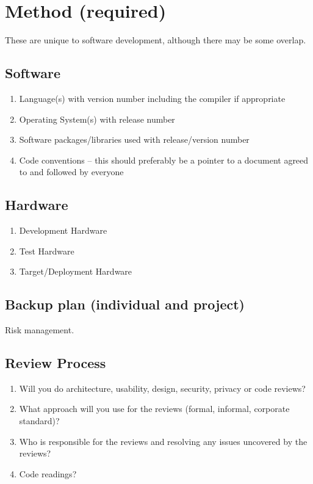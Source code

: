\section{Method (required)}
These are unique to software development, although there may be some overlap.

\subsection{Software}
\begin{enumerate}
\item Language(s) with version number including the compiler if appropriate 
\item Operating System(s) with release number 
\item Software packages/libraries used with release/version number 
\item Code conventions – this should preferably be a pointer to a document agreed to and followed by everyone 
\end{enumerate}

\subsection{Hardware}
\begin{enumerate}
\item Development Hardware 
\item Test Hardware 
\item Target/Deployment Hardware 
\end{enumerate}

\subsection{Backup plan (individual and project)} 

Risk management.

\subsection{Review Process} 
\begin{enumerate}
\item Will you do architecture, usability, design, security, privacy or code reviews?
\item What approach will you use for the reviews (formal, informal, corporate standard)? 
\item Who is responsible for the reviews and resolving any issues uncovered by the reviews? 
\item Code readings? 
\end{enumerate}

